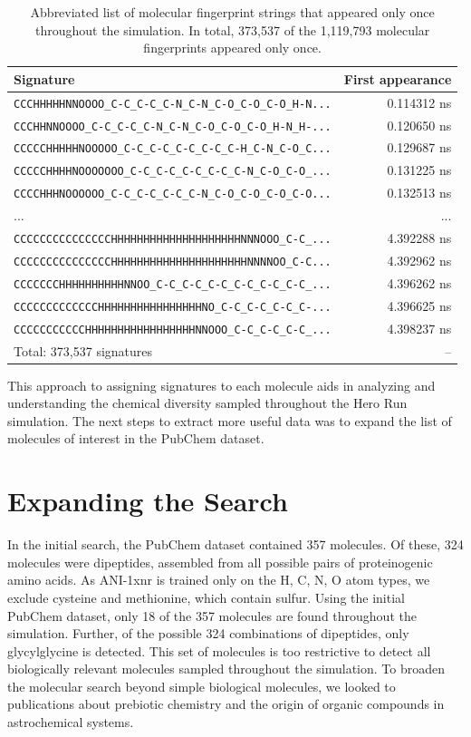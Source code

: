 \begin{table}[h!]
\centering
\caption[Unique molecular fingerprints]{Abbreviated list of molecular fingerprint strings that appeared only once throughout the simulation. In total, 373,537 of the 1,119,793 molecular fingerprints appeared only once.
}\label{tbl:signatures_appeared_once}
\begin{tabularx}{0.85\textwidth}{lr}  
\toprule
Signature & First appearance \\
\midrule
\verb|CCCHHHHHNNOOOO_C-C_C-C_C-N_C-N_C-O_C-O_C-O_H-N...| & 0.114312 ns \\
\verb|CCCHHNNOOOO_C-C_C-C_C-N_C-N_C-O_C-O_C-O_H-N_H-...| & 0.120650 ns \\
\verb|CCCCCHHHHHNOOOOO_C-C_C-C_C-C_C-C_C-H_C-N_C-O_C...| & 0.129687 ns \\
\verb|CCCCCHHHHNOOOOOOO_C-C_C-C_C-C_C-C_C-N_C-O_C-O_...| & 0.131225 ns \\
\verb|CCCCHHHNOOOOOO_C-C_C-C_C-C_C-N_C-O_C-O_C-O_C-O...| & 0.132513 ns \\
... & ... \\
\verb|CCCCCCCCCCCCCCCHHHHHHHHHHHHHHHHHHHHNNNOOO_C-C_...| & 4.392288 ns \\
\verb|CCCCCCCCCCCCCCCHHHHHHHHHHHHHHHHHHHHHNNNNOO_C-C...| & 4.392962 ns \\
\verb|CCCCCCCHHHHHHHHHHNNOO_C-C_C-C_C-C_C-C_C-C_C-C_...| & 4.396262 ns \\
\verb|CCCCCCCCCCCCCHHHHHHHHHHHHHHHHNO_C-C_C-C_C-C_C-...| & 4.396625 ns \\
\verb|CCCCCCCCCCCHHHHHHHHHHHHHHHHHNNOOO_C-C_C-C_C-C_...| & 4.398237 ns \\
Total: 373,537 signatures & -- \\
\bottomrule
\end{tabularx}
\end{table}

This approach to assigning signatures to each molecule aids in analyzing and understanding the chemical diversity sampled throughout the Hero Run simulation.
The next steps to extract more useful data was to expand the list of molecules of interest in the PubChem dataset.

\section{Expanding the Search}
\label{sec:expanding_the_search}

In the initial search, the PubChem dataset contained 357 molecules.
Of these, 324 molecules were dipeptides, assembled from all possible pairs of proteinogenic amino acids.
As ANI-1xnr is trained only on the H, C, N, O atom types, we exclude cysteine and methionine, which contain sulfur.
Using the initial PubChem dataset, only 18 of the 357 molecules are found throughout the simulation.
Further, of the possible 324 combinations of dipeptides, only glycylglycine is detected.
This set of molecules is too restrictive to detect all biologically relevant molecules sampled throughout the simulation. 
To broaden the molecular search beyond simple biological molecules, we looked to publications about prebiotic chemistry and the origin of organic compounds in astrochemical systems.

